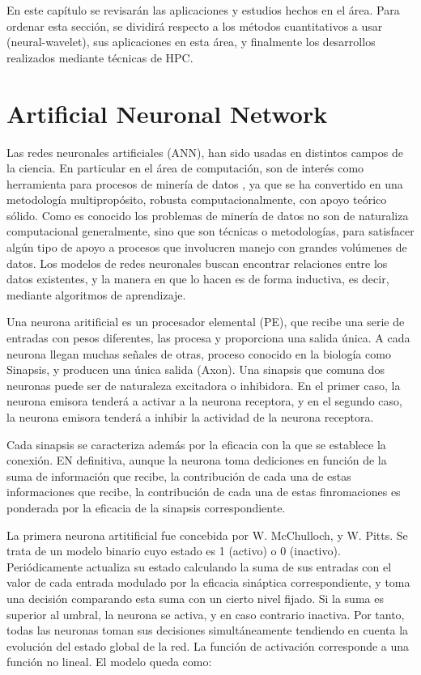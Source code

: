 En este capítulo se revisarán las aplicaciones y estudios hechos en el área. Para ordenar esta sección, se
dividirá respecto a los métodos cuantitativos a usar (neural-wavelet), sus aplicaciones en esta área, y finalmente
los desarrollos realizados mediante técnicas de HPC.

\section{Artificial Neuronal Network}

Las redes neuronales artificiales (ANN), han sido usadas en distintos campos de la ciencia. En particular en el área de computación, son de interés
como herramienta para procesos de minería de datos \cite{bigus1996data}, ya que se ha convertido en una metodología multipropósito, robusta computacionalmente, 
con apoyo teórico sólido. Como es conocido los problemas de minería de datos no son de naturaliza computacional generalmente, sino que son técnicas o metodologías, para
satisfacer algún tipo de apoyo a procesos que involucren manejo con grandes volúmenes de datos. Los modelos de redes neuronales buscan encontrar relaciones entre los datos existentes, y
la manera en que lo hacen es de forma inductiva, es decir, mediante algoritmos de aprendizaje.

Una neurona aritificial es un procesador elemental (PE), que recibe una serie de entradas con pesos diferentes, las procesa y proporciona una salida única. A cada neurona llegan muchas señales
de otras, proceso conocido en la biología como Sinapsis, y producen una única salida (Axon). Una sinapsis que comuna dos neuronas puede ser de naturaleza excitadora o inhibidora. En el primer caso, 
la neurona emisora tenderá a activar a la neurona receptora, y en el segundo caso, la neurona emisora tenderá a inhibir la actividad de la neurona receptora.

Cada sinapsis se caracteriza además por la eficacia con la que se establece la conexión. EN definitiva, aunque la neurona toma dediciones en función de la suma de información que recibe, la contribución
de cada una de estas informaciones que recibe, la contribución de cada una de estas finromaciones es ponderada por la eficacia de la sinapsis correspondiente.

La primera neurona artitificial fue concebida por W. McChulloch, y W. Pitts. Se trata de un modelo binario cuyo estado es 1 (activo) o 0 (inactivo). Periódicamente actualiza su estado
calculando la suma de sus entradas con el valor de cada entrada modulado por la eficacia sináptica correspondiente, y toma una decisión comparando esta suma con un cierto nivel fijado. Si
la suma es superior al umbral, la neurona se activa, y en caso contrario inactiva. Por tanto, todas las neuronas toman sus decisiones simultáneamente tendiendo en cuenta la evolución del estado
global de la red. La función de activación corresponde a una función no lineal. El modelo queda como:


